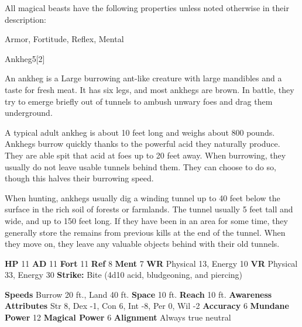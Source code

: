         All magical beasts have the following properties unless noted otherwise in their description:
        
    
     Armor,
     Fortitude,
     Reflex,
     Mental
  
  
      
  \begin{monsection}{Ankheg}{5}[2]
    \vspace{-1em}\vspace{-1em}
    \vspace{0em}

    
        An ankheg is a Large burrowing ant-like creature with large mandibles and a taste for fresh meat.
        It has six legs, and most ankhegs are brown.
        In battle, they try to emerge briefly out of tunnels to ambush unwary foes and drag them underground.
      
        A typical adult ankheg is about 10 feet long and weighs about 800 pounds.
        Ankhegs burrow quickly thanks to the powerful acid they naturally produce.
        They are able spit that acid at foes up to 20 feet away.
        When burrowing, they usually do not leave usable tunnels behind them.
        They can choose to do so, though this halves their burrowing speed.
      
        When hunting, ankhegs usually dig a winding tunnel up to 40 feet below the surface in the rich soil of forests or farmlands.
        The tunnel usually 5 feet tall and wide, and up to 150 feet long.
        If they have been in an area for some time, they generally store the remains from previous kills at the end of the tunnel.
        When they move on, they leave any valuable objects behind with their old tunnels.
      

    \begin{spellcontent}
      \begin{spelltargetinginfo}
        \pari \textbf{HP} 11 \monsep
          \textbf{AD} 11 \monsep
          \textbf{Fort} 11 \monsep
          \textbf{Ref} 8 \monsep
          \textbf{Ment} 7
        \pari \textbf{WR} Physical 13, Energy 10 \monsep
        \textbf{VR} Physical 33, Energy 30
        \pari \textbf{Strike:}
            Bite  (4d10 acid, bludgeoning, and piercing)
      \end{spelltargetinginfo}
    \end{spellcontent}
    \begin{monsterfooter}
      \pari \textbf{Speeds} Burrow 20 ft., Land 40 ft. \monsep
        \textbf{Space} 10 ft. \monsep
        \textbf{Reach} 10 ft.
      \pari \textbf{Awareness} 
      \pari \textbf{Attributes}
        Str 8, Dex -1,
        Con 6, Int -8,
        Per 0, Wil -2
      \pari \textbf{Accuracy} 6 \monsep
        \textbf{Mundane Power} 12 \monsep
      \textbf{Magical Power} 6
      \pari \textbf{Alignment} Always true neutral
    \end{monsterfooter}
  \end{monsection}
